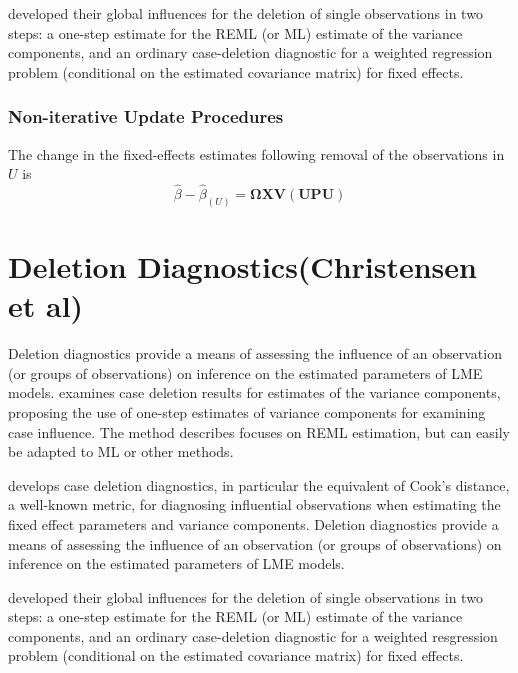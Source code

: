 \documentclass[12pt, a4paper]{report}
\theoremstyle{plain}
\theoremstyle{definition}
\theoremstyle{remark}
\begin{document}
\citet{Christensen} developed their global influences for the deletion of single observations in two steps: a one-step estimate for the REML (or ML) estimate of the variance components, and an ordinary case-deletion diagnostic for a weighted regression problem (conditional on the estimated covariance matrix) for fixed effects.
	
	

	\subsubsection{Non-iterative Update Procedures}
	
	
	The change in the fixed-effects estimates following removal of the observations in $U$ is
	\[ \hat{\beta} - \hat{\beta}_{(U)} = \boldsymbol{\Omega}\boldsymbol{X}\boldsymbol{V}
	\left( \boldsymbol{U} \boldsymbol{P}\boldsymbol{U}\right)   \]

	

	\section{Deletion Diagnostics(Christensen et al)}
		Deletion diagnostics provide a means of assessing the influence of an observation (or groups of observations) on inference on the estimated parameters of LME models.
	\citet{Christensen}examines case deletion results for estimates of
		the variance components, proposing the use of one-step estimates
		of variance components for examining case influence. The method
		describes focuses on REML estimation, but can easily be adapted to
		ML or other methods.

\citet{Christensen} develops  case deletion diagnostics, in particular the equivalent of  Cook's distance, a well-known metric, for diagnosing influential observations when estimating the fixed effect parameters and variance components. Deletion diagnostics provide a means of assessing the influence of an observation (or groups of observations) on inference on the estimated parameters of LME models.

\citet{Christensen} developed their global influences for the deletion of single observations in two steps: a one-step estimate for the REML (or ML) estimate of the variance components, and an ordinary case-deletion diagnostic for a weighted resgression problem (conditional on the estimated covariance matrix) for fixed effects.
\end{document}
